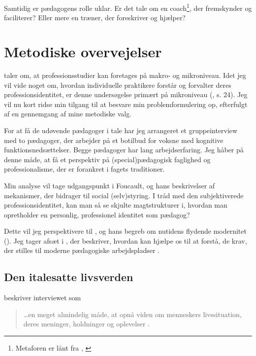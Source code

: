 Samtidig er pædagogens rolle uklar.
Er det tale om en coach\footnote{Metaforen er lånt fra \citeauthor{hurFrigorelsensMagt2015}, \citeyear{hurFrigorelsensMagt2015}}, der fremskynder og faciliterer?
Eller mere en træner, der foreskriver og hjælper?

\section{Metodiske overvejelser}

\citeauthor{molanderProfesjonsstudierIntroduksjon2008} taler om, at  professionsstudier kan foretages på makro- og mikroniveau.
Idet jeg vil vide noget om, hvordan individuelle praktikere forstår og forvalter deres professionsidentitet, er denne undersøgelse primært på mikroniveau (\citeyear{molanderProfesjonsstudierIntroduksjon2008}, s. 24).
Jeg vil nu kort ridse min tilgang til at besvare min problemformulering op, efterfulgt af en gennemgang af mine metodiske valg.

For at få de udøvende pædagoger i tale har jeg arrangeret et gruppeinterview med to pædagoger, der arbejder på et botilbud for voksne med kognitive funktionsnedsættelser.
Begge pædagoger har lang arbejdserfaring.
Jeg håber på denne måde, at få et perspektiv på (special)pædagogisk faglighed og professionalisme, der er forankret i fagets traditioner.

Min analyse vil tage udgangspunkt i Foucault, og hans beskrivelser af mekanismer, der bidrager til social (selv)styring.
I tråd med den subjektiverede professionsidentitet, kan man så se skjulte magtstrukturer i, hvordan man opretholder en personlig, professionel identitet som pædagog?

Dette vil jeg perspektivere til \citeauthor{baumanLiquidModernity2000}, og hans begreb om nutidens flydende modernitet (\citeyear{baumanLiquidModernity2000}).
Jeg tager afsæt i \citeauthor{kofodOrganisationOgLedelse2016}, der beskriver, hvordan \citeauthor{baumanLiquidModernity2000} kan hjælpe os til at forstå, de krav, der stilles til moderne pædagogiske arbejdspladser \autocite{kofodOrganisationOgLedelse2016}.


\subsection{Den italesatte livsverden}
\citeauthor{tanggaardInterviewetSamtalenSom2015} beskriver interviewet som

\begin{quote}
\ldots en meget almindelig måde, at opnå viden om menneskers livssituation, deres meninger, holdninger og oplevelser \autocite[s. 29]{tanggaardInterviewetSamtalenSom2015}.
\end{quote}

